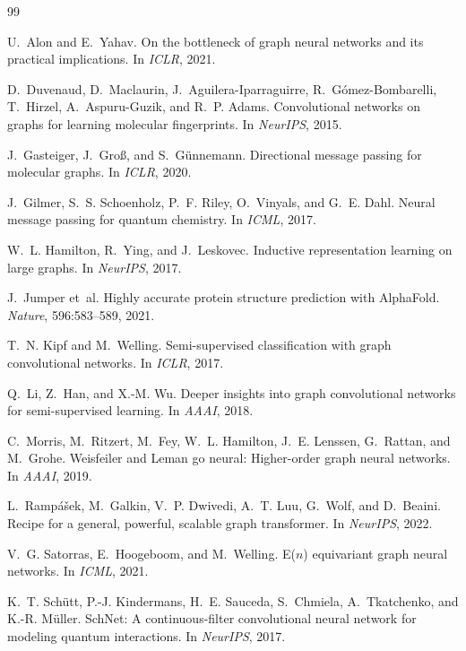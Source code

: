 \documentclass[11pt,a4paper]{article}
\begin{document}
\begin{thebibliography}{99}

U.~Alon and E.~Yahav.
\newblock On the bottleneck of graph neural networks and its practical
  implications.
\newblock In \emph{ICLR}, 2021.

D.~Duvenaud, D.~Maclaurin, J.~Aguilera-Iparraguirre, R.~Gómez-Bombarelli,
  T.~Hirzel, A.~Aspuru-Guzik, and R.~P. Adams.
\newblock Convolutional networks on graphs for learning molecular
  fingerprints.
\newblock In \emph{NeurIPS}, 2015.

J.~Gasteiger, J.~Groß, and S.~Günnemann.
\newblock Directional message passing for molecular graphs.
\newblock In \emph{ICLR}, 2020.

J.~Gilmer, S.~S. Schoenholz, P.~F. Riley, O.~Vinyals, and G.~E. Dahl.
\newblock Neural message passing for quantum chemistry.
\newblock In \emph{ICML}, 2017.

W.~L. Hamilton, R.~Ying, and J.~Leskovec.
\newblock Inductive representation learning on large graphs.
\newblock In \emph{NeurIPS}, 2017.

J.~Jumper et~al.
\newblock Highly accurate protein structure prediction with AlphaFold.
\newblock \emph{Nature}, 596:583--589, 2021.

T.~N. Kipf and M.~Welling.
\newblock Semi-supervised classification with graph convolutional networks.
\newblock In \emph{ICLR}, 2017.

Q.~Li, Z.~Han, and X.-M. Wu.
\newblock Deeper insights into graph convolutional networks for
  semi-supervised learning.
\newblock In \emph{AAAI}, 2018.

C.~Morris, M.~Ritzert, M.~Fey, W.~L. Hamilton, J.~E. Lenssen, G.~Rattan, and
  M.~Grohe.
\newblock Weisfeiler and Leman go neural: Higher-order graph neural networks.
\newblock In \emph{AAAI}, 2019.

L.~Rampášek, M.~Galkin, V.~P. Dwivedi, A.~T. Luu, G.~Wolf, and D.~Beaini.
\newblock Recipe for a general, powerful, scalable graph transformer.
\newblock In \emph{NeurIPS}, 2022.

V.~G. Satorras, E.~Hoogeboom, and M.~Welling.
\newblock E($n$) equivariant graph neural networks.
\newblock In \emph{ICML}, 2021.

K.~T. Schütt, P.-J. Kindermans, H.~E. Sauceda, S.~Chmiela, A.~Tkatchenko, and
  K.-R. Müller.
\newblock SchNet: A continuous-filter convolutional neural network for
  modeling quantum interactions.
\newblock In \emph{NeurIPS}, 2017.


\end{thebibliography}
\end{document}
